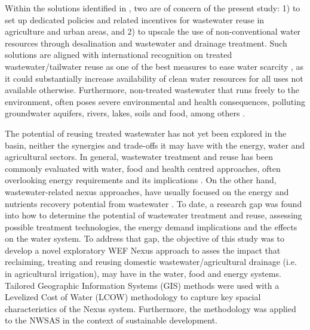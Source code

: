 Within the solutions identified in \cite{uneceReconcilingResourceUses2020}, two are of concern of the present study: 1) to set up dedicated policies and related incentives for wastewater reuse in agriculture and urban areas, and 2) to upscale the use of non-conventional water resources through desalination and wastewater and drainage treatment. 
Such solutions are aligned with international recognition on treated wastewater/tailwater reuse as one of the best measures to ease water scarcity \cite{unescoWastewaterUntappedResource2017,GARCIA2015154}, as it could substantially increase availability of clean water resources for all uses not available otherwise. Furthermore, non-treated wastewater that runs freely to the environment, often poses severe environmental and health consequences, polluting groundwater aquifers, rivers, lakes, soils and food, among others \cite{unescoWastewaterUntappedResource2017}.

The potential of reusing treated wastewater has not yet been explored in the basin, neither the synergies and trade-offs it may have with the energy, water and agricultural sectors. In general, wastewater treatment and reuse has been commonly evaluated with water, food and health centred approaches, often overlooking energy requirements and its implications \cite{unescoWastewaterUntappedResource2017,hettiarachchiSAFEUSEWASTEWATERa,cheniniEvaluationThreeDecades2011,qadirNonconventionalWaterResources2007}. On the other hand, wastewater-related nexus approaches, have usually focused on the energy and nutrients recovery potential from wastewater \cite{guestNewPlanningDesign2009,gremillionWastewaterResourceWaterWasteEnergy,unescoWastewaterUntappedResource2017}. To date, a research gap was found into how to determine the potential of wastewater treatment and reuse, assessing possible treatment technologies, the energy demand implications and the effects on the water system. To address that gap, the objective of this study was to develop a novel exploratory WEF Nexus approach to asses the impact that reclaiming, treating and reusing domestic wastewater/agricultural drainage (i.e. in agricultural irrigation), may have in the water, food and energy systems. Tailored Geographic Information Systems (GIS) methods were used with a Levelized Cost of Water (LCOW) methodology \cite{ISI:000209031000003} to capture key spacial characteristics of the Nexus system. Furthermore, the methodology was applied to the NWSAS in the context of sustainable development.